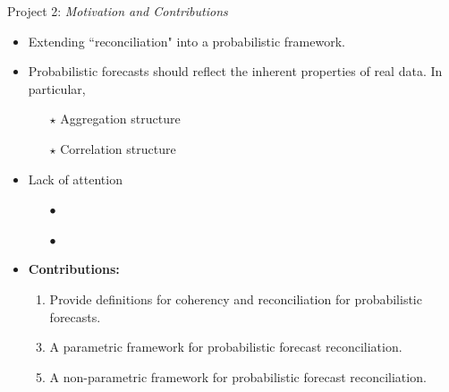 \documentclass[11pt,xcolor=dvipsnames,table]{beamer} %
\begin{document}
\begin{frame}[noframenumbering]{Project 2: \textit{Motivation and Contributions}}
\begin{itemize}[<+-| alert@+>]
			\item Extending ``reconciliation" into a probabilistic framework.
			\item[]
			\item Probabilistic forecasts should reflect the inherent properties of real data. In particular, 
			\begin{itemize}[<+-| alert@+>]
				\item[$\star$] Aggregation structure
				\item[$\star$] Correlation structure
			\end{itemize}
			\item Lack of attention
				\begin{itemize}[<+-| alert@+>]
					\item[$\bullet$] \citet{BenTaieb2017}
					\item[$\bullet$] \citet{Jeon2018}
			\end{itemize}
			\item[]
				
	\item \textbf{\color{Maroon}Contributions:} 
	\begin{enumerate}
		\item Provide definitions for coherency and reconciliation for probabilistic forecasts.
		\item[]
		\item A parametric framework for probabilistic forecast reconciliation.
		\item[]
		\item A non-parametric framework for probabilistic forecast reconciliation.
	\end{enumerate}	
	\item[]
	
\end{itemize}    
\end{frame}


%	
\end{document}
